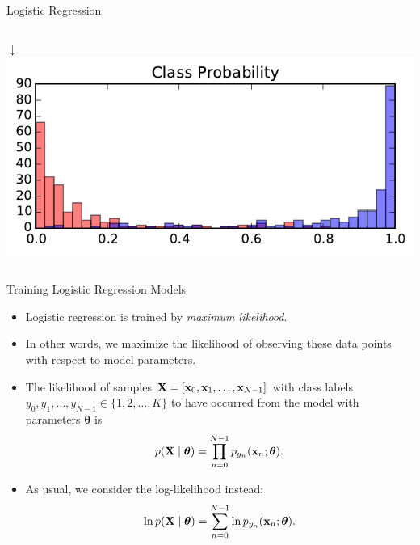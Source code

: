\documentclass[10pt, aspectratio=169]{beamer} %
\newcommand{\thb}{\boldsymbol{\theta}}
\newcommand{\X}{{\bf X}}
\newcommand{\x}{{\bf x}}
\begin{document}
\begin{frame}{Logistic Regression}
\begin{columns}[onlytextwidth]
\begin{center}
	\vspace*{-0.2cm}$\downarrow$\\
	\includegraphics[width=\textwidth]{LR_prob.pdf}
\end{center}
\end{columns}
\end{frame}

\begin{frame}{Training Logistic Regression Models}
\begin{itemize}
\item Logistic regression is trained by \emph{maximum likelihood}.
\item In other words, we maximize the likelihood of observing these
data points with respect to model parameters.
\item The likelihood of samples $\X = [\x_0, \x_1, \ldots, \x_{N-1}]$ with class labels
$y_0, y_1,\ldots, y_{N-1} \in \{1,2,\ldots, K\}$ to have occurred from
the model with parameters $\thb$ is
\[
p(\X \mid \thb) = \prod_{n = 0}^{N-1} p_{y_n}(\x_n; \thb).
\]
\item As usual, we consider the log-likelihood instead:
\[
\ln p(\X \mid \thb) = \sum_{n = 0}^{N-1} \ln p_{y_n}(\x_n; \thb).
\]
\end{itemize}
\end{frame}
\end{document}

